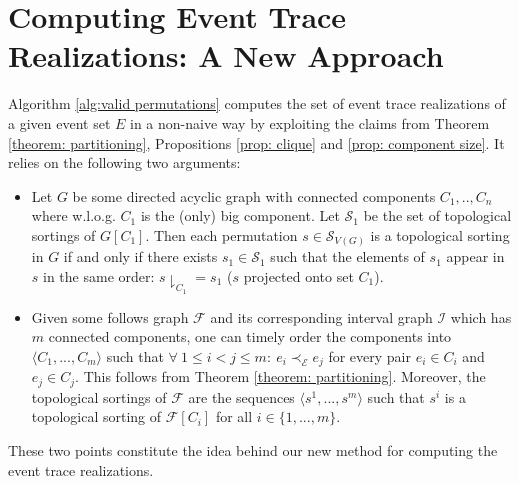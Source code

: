 \section{Computing Event Trace Realizations: A New Approach}
Algorithm \ref{alg:valid permutations} computes the set of event trace realizations of a given event set $E$ in a non-naive way by exploiting the claims from Theorem \ref{theorem: partitioning}, Propositions \ref{prop: clique} and \ref{prop: component size}.
It relies on the following two arguments:
\begin{itemize}
\item Let $G$ be some directed acyclic graph with connected components $C_1,..,C_n$ where w.l.o.g. $C_1$ is the (only) big component.
Let $\mathcal{S}_1$ be the set of topological sortings of $G[C_1]$.
Then each permutation $s \in \mathcal{S}_{V(G)}$ is a topological sorting in $G$ if and only if there exists $s_1 \in \mathcal{S}_1$ such that the elements of $s_1$ appear in $s$ in the same order: $s \downharpoonright_{C_1} = s_1$ ($s$ projected onto set $C_1$).
\item Given some follows graph $\mathcal{F}$ and its corresponding interval graph $\mathcal{I}$ which has $m$ connected components, one can timely order the components into $\langle C_1,...,C_m \rangle$ such that $\forall ~ 1 \leq i<j \leq m: ~ e_i \prec_{\mathcal{E}} e_j$ for every pair $e_i \in C_i$ and $e_j \in C_j$.
This follows from Theorem \ref{theorem: partitioning}.
Moreover, the topological sortings of $\mathcal{F}$ are the sequences $\langle s^1,...,s^m \rangle$ such that $s^i$ is a topological sorting of $\mathcal{F}[C_i]$ for all $i \in \{1,...,m\}$.
\end{itemize}
These two points constitute the idea behind our new method for computing the event trace realizations.
